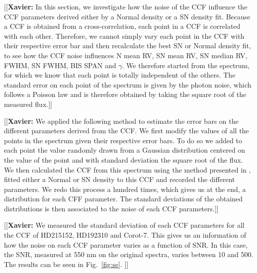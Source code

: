\documentclass{aa}
\newcommand{\xavier}[1]{{\color{blue}[[\textbf{Xavier: }#1]]}}
\begin{document}
\xavier{In this section, we investigate how the noise of the CCF influence the CCF parameters derived either by a Normal density or a SN density fit. Because a CCF is obtained from a cross-correlation, each point in a CCF is correlated with each other. Therefore, we cannot simply vary each point in the CCF with their respective error bar and then recalculate the best SN or Normal density fit, to see how the CCF noise influences N mean RV, SN mean RV, SN median RV, FWHM, SN FWHM, BIS SPAN and $\gamma$. We therefore started from the spectrum, for which we know that each point is totally independent of the others. The standard error on each point of the spectrum is given by the photon noise, which follows a Poisson law and is therefore obtained by taking the square root of the measured flux.}

\xavier{We applied the following method to estimate the error bars on the different parameters derived from the CCF. We first modify the values of all the points in the spectrum given their respective error bars. To do so we added to each point the value randomly drawn from a Gaussian distribution centered on the value of the point and with standard deviation the square root of the flux. We then calculated the CCF from this spectrum using the method presented in \citet{Pepe-2002a}, fitted either a Normal or SN density to this CCF and recorded the different parameters. We redo this process a hundred times, which gives us at the end, a distribution for each CFF parameter. The standard deviations of the obtained distributions is then associated to the noise of each CCF parameters.}

\xavier{We measured the standard deviation of each CCF parameters for all the CCF of HD215152, HD192310 and Corot-7. This gives us an information of how the noise on each CCF parameter varies as a function of SNR. In this case, the SNR, measured at 550 nm on the original spectra, varies between 10 and 500. The results can be seen in Fig.~\ref{fig:se}. }
\end{document}
